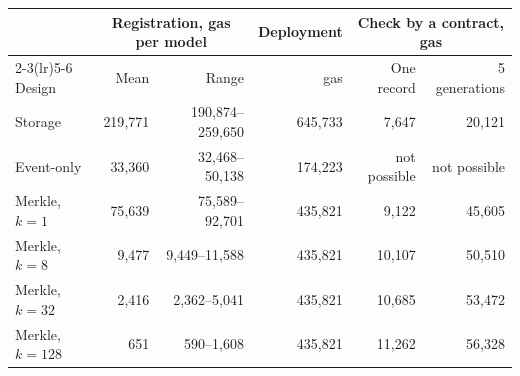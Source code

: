 \begin{tabular}{lrrrrr}
\toprule
 & \multicolumn{2}{c}{Registration, gas per model} & Deployment & \multicolumn{2}{c}{Check by a contract, gas} \\
\cmidrule(lr){2-3}\cmidrule(lr){5-6}
Design & Mean & Range & gas & One record & 5 generations \\
\midrule
Storage & 219{,}771 & 190{,}874--259{,}650 & 645{,}733 & 7{,}647 & 20{,}121 \\
Event-only & 33{,}360 & 32{,}468--50{,}138 & 174{,}223 & not possible & not possible \\
Merkle, $k=1$ & 75{,}639 & 75{,}589--92{,}701 & 435{,}821 & 9{,}122 & 45{,}605 \\
Merkle, $k=8$ & 9{,}477 & 9{,}449--11{,}588 & 435{,}821 & 10{,}107 & 50{,}510 \\
Merkle, $k=32$ & 2{,}416 & 2{,}362--5{,}041 & 435{,}821 & 10{,}685 & 53{,}472 \\
Merkle, $k=128$ & 651 & 590--1{,}608 & 435{,}821 & 11{,}262 & 56{,}328 \\
\bottomrule
\end{tabular}
